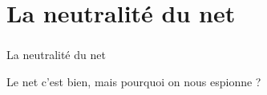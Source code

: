 

\section{La neutralité du net}
\begin{frame}\frametitle{}
    {\Huge La neutralité du net}

    \vspace{2em}

    Le net c'est bien, mais pourquoi on nous espionne ?
\end{frame}
